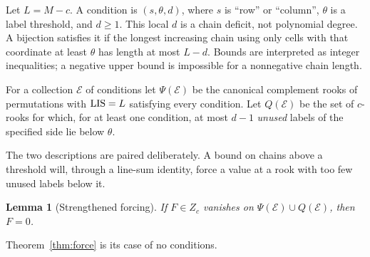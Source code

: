 \documentclass[11pt,a4paper]{article}
\newtheorem{lemma}[theorem]{Lemma}
\theoremstyle{definition}\newtheorem{definition}[theorem]{Definition}
\theoremstyle{remark}\newtheorem{remark}[theorem]{Remark}
\begin{document}
Let $L=M-c$. A condition is $(s,\theta,d)$, where $s$ is ``row'' or ``column'', $\theta$ is a label threshold, and $d\ge1$. This local $d$ is a chain deficit, not polynomial degree. A bijection satisfies it if the longest increasing chain using only cells with that coordinate at least $\theta$ has length at most $L-d$. Bounds are interpreted as integer inequalities; a negative upper bound is impossible for a nonnegative chain length.

For a collection $\mathcal E$ of conditions let $\Psi(\mathcal E)$ be the canonical complement rooks of permutations with $\operatorname{LIS}=L$ satisfying every condition. Let $Q(\mathcal E)$ be the set of $c$-rooks for which, for at least one condition, at most $d-1$ \emph{unused} labels of the specified side lie below $\theta$.

The two descriptions are paired deliberately. A bound on chains above a threshold will, through a line-sum identity, force a value at a rook with too few unused labels below it.

\begin{lemma}[Strengthened forcing]\label{lem:GP}
If $F\in Z_c$ vanishes on $\Psi(\mathcal E)\cup Q(\mathcal E)$, then $F=0$.
\end{lemma}
Theorem~\ref{thm:force} is its case of no conditions.
\end{document}
